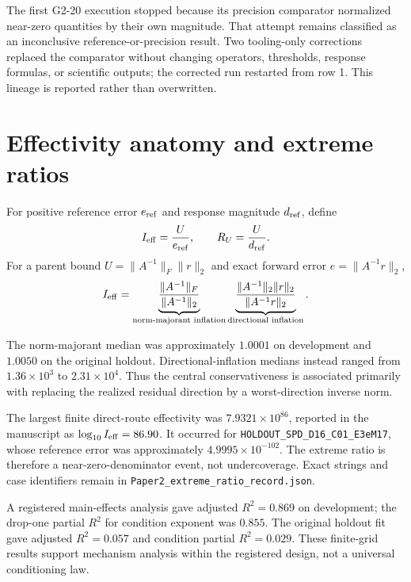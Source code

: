 \documentclass[11pt]{article}
\begin{document}
The first G2-20 execution stopped because its precision comparator normalized
near-zero quantities by their own magnitude. That attempt remains classified
as an inconclusive reference-or-precision result. Two tooling-only corrections
replaced the comparator without changing operators, thresholds, response
formulas, or scientific outputs; the corrected run restarted from row 1. This
lineage is reported rather than overwritten.

\section{Effectivity anatomy and extreme ratios}
For positive reference error $e_{\rm ref}$ and response magnitude
$d_{\rm ref}$, define
\[
 I_{\rm eff}=\frac{U}{e_{\rm ref}},
 \qquad
 R_U=\frac{U}{d_{\rm ref}}.
\]
For a parent bound $U=\lVert A^{-1}\rVert_F\lVert r\rVert_2$ and exact
forward error $e=\lVert A^{-1}r\rVert_2$,
\[
 I_{\rm eff}
 =
 \underbrace{\frac{\lVert A^{-1}\rVert_F}
 {\lVert A^{-1}\rVert_2}}_{\text{norm-majorant inflation}}
 \underbrace{\frac{\lVert A^{-1}\rVert_2\lVert r\rVert_2}
 {\lVert A^{-1}r\rVert_2}}_{\text{directional inflation}}.
\]

\begin{table}[htbp]\centering\footnotesize
\caption{Factorized direct-route effectivity anatomy}\label{tab:S5}

\end{table}

The norm-majorant median was approximately $1.0001$ on development and
$1.0050$ on the original holdout. Directional-inflation medians instead
ranged from $1.36\times10^3$ to $2.31\times10^4$. Thus the central
conservativeness is associated primarily with replacing the realized residual
direction by a worst-direction inverse norm.

The largest finite direct-route effectivity was
$7.9321\times10^{86}$, reported in the manuscript as
$\log_{10}I_{\rm eff}=86.90$. It occurred for
\texttt{HOLDOUT\_SPD\_D16\_C01\_E3eM17}, whose reference error was
approximately $4.9995\times10^{-102}$. The extreme ratio is therefore a
near-zero-denominator event, not undercoverage. Exact strings and case
identifiers remain in \texttt{Paper2\_extreme\_ratio\_record.json}.

A registered main-effects analysis gave adjusted $R^2=0.869$ on development;
the drop-one partial $R^2$ for condition exponent was $0.855$. The original
holdout fit gave adjusted $R^2=0.057$ and condition partial $R^2=0.029$.
These finite-grid results support mechanism analysis within the registered
design, not a universal conditioning law.
\end{document}
